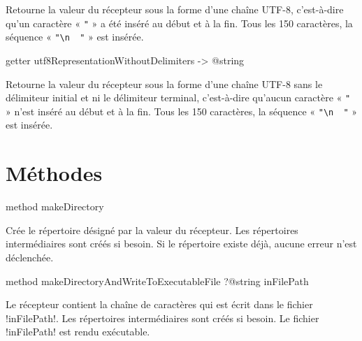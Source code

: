 Retourne la valeur du récepteur sous la forme d'une chaîne UTF-8, c'est-à-dire qu'un caractère « \texttt{"} » a été inséré au début et à la fin. Tous les 150 caractères, la séquence « \texttt{"\textbackslash n~~"} » est insérée.









\begin{galgasbox}
getter utf8RepresentationWithoutDelimiters -> @string
\end{galgasbox}

Retourne la valeur du récepteur sous la forme d'une chaîne UTF-8 sans le délimiteur initial et ni le délimiteur terminal, c'est-à-dire qu'aucun caractère « \texttt{"} » n'est inséré au début et à la fin. Tous les 150 caractères, la séquence « \texttt{"\textbackslash n~~"} » est insérée.














\section{Méthodes}






\begin{galgasbox}
method makeDirectory
\end{galgasbox}

Crée le répertoire désigné par la valeur du récepteur. Les répertoires intermédiaires sont créés si besoin. Si le répertoire existe déjà, aucune erreur n'est déclenchée.







\begin{galgasbox}
method makeDirectoryAndWriteToExecutableFile ?@string inFilePath
\end{galgasbox}

Le récepteur contient la chaîne de caractères qui est écrit dans le fichier \ggs!inFilePath!. Les répertoires intermédiaires sont créés si besoin. Le fichier \ggs!inFilePath! est rendu exécutable.







